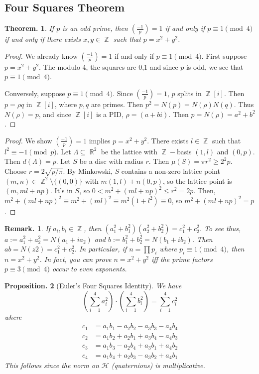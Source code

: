\documentclass[11pt, a4paper]{memoir}
\DeclareMathOperator{\Z}{{\mathbb{Z}}}
\DeclareMathOperator{\R}{{\mathbb{R}}}
\theoremstyle{change}
\newtheorem{theorem}{Theorem.}[section]
\newtheorem{proposition}[theorem]{Proposition.}
\theoremstyle{plain}
\theoremstyle{nonumberplain}
\newtheorem{remark}{Remark.}
\newtheorem{proof}{Proof}
\newcommand{\lgs}[2]{\ensuremath{\left(\frac{#1}{#2}\right)}}
\numberwithin{equation}{section}
\begin{document}
\subsection{Four Squares Theorem}
\begin{theorem}
    If $p$ is an odd prime, then $\lgs{-1}{p}=1$ if and only if $p\equiv 1\pmod{4}$ if and only if there exists $x,y\in\Z$ such that $p=x^2+y^2$.
\end{theorem}
\begin{proof}
    We already know $\lgs{-1}{p}=1$ if and only if $p\equiv 1\pmod{4}$.
    First suppose $p=x^2+y^2$.
    The modulo 4, the squares are 0,1 and since $p$ is odd, we see that $p\equiv 1\pmod{4}$.

    Conversely, suppose $p\equiv 1\pmod{4}$.
    Since $\lgs{-1}{p}=1$, $p$ splits in $\Z[i]$.
    Then $p=\rho q$ in $\Z[i]$, where $p,q$ are primes.
    Then $p^2=N(p)=N(\rho)N(q)$.
    Thus $N(\rho)=p$, and since $\Z[i]$ is a PID, $\rho=(a+bi)$.
    Then $p=N(\rho)=a^2+b^2$.
\end{proof}
\begin{proof}
    We show $\lgs{-1}{p}=1$ implies $p=x^2+y^2$.
    There exists $l\in\Z$ such that $l^2\equiv -1\pmod{p}$.
    Let $\Lambda\subseteq\R^2$ be the lattice with $\Z-$basis $(1,l)$ and $(0,p)$.
    Then $d(\Lambda)=p$.
    Let $S$ be a disc with radius $r$.
    Then $\mu(S)=\pi r^2\geq 2^2p$.
    Choose $r=2\sqrt{p/\pi}$.
    By Minkowski, $S$ contains a non-zero lattice point $(m,n)\in\Z^2\setminus\{(0,0)\}$ with $m(1,l)+n(0,p)$, so the lattice point is $(m,ml+np)$.
    It's in $S$, so $0<m^2+(ml+np)^2\leq r^2=2p$.
    Then, $m^2+(ml+np)^2\equiv m^2+(ml)^2\equiv m^2(1+l^2)\equiv 0$, so $m^2+(ml+np)^2=p$.
\end{proof}
\begin{remark}
    If $a_i,b_i\in\Z$, then $(a_1^2+b_1^2)(a_2^2+b_2^2)=c_1^2+c_2^2$.
    To see thus, $a:=a_1^2+a_2^2=N(a_1+ia_2)$ and $b:=b_1^2+b_2^2=N(b_1+ib_2)$.
    Then $ab=N(z2)=c_1^2+c_2^2$.
    In particular, if $n=\prod p_i$ where $p_i\equiv 1\pmod{4}$, then $n=x^2+y^2$.
    In fact, you can prove $n=x^2+y^2$ iff the prime factors $p\equiv 3\pmod{4}$ occur to even exponents.
\end{remark}
\begin{proposition}[Euler's Four Squares Identity]
    We have
    \begin{equation*}
        \left(\sum_{i=1}^4 a_i^2\right)\cdot\left(\sum_{i=1}^4 b_i^2\right)=\sum_{i=1}^4 c_i^2
    \end{equation*}
    where
    \begin{align*}
        c_1 &= a_1b_1-a_2b_2-a_3b_3-a_4b_4\\
        c_2 &= a_1b_2+a_2b_1+a_3b_4-a_4b_3\\
        c_3 &= a_1b_3-a_2b_4+a_3b_1+a_4b_2\\
        c_4 &= a_1b_4+a_2b_3-a_3b_2+a_4b_1
    \end{align*}
    This follows since the norm on $\mathcal{H}$ (quaternions) is multiplicative.
\end{proposition}
\end{document}
